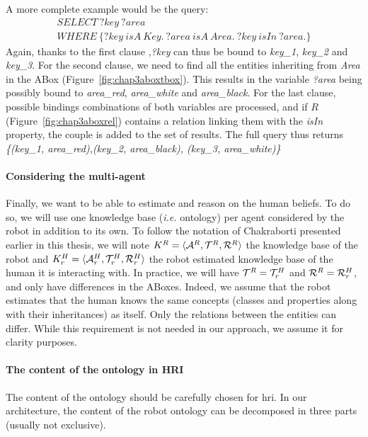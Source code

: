 \documentclass[a4paper,11pt,twoside]{StyleThese}
\begin{document}
A more complete example would be the query:
\begin{multline*}
SELECT \ ?key \ ?area\\
WHERE \ \{?key \ isA \ Key. \ ?area \ isA \ Area. \ ?key\ isIn \ ?area.\}
\end{multline*}
Again, thanks to the first clause ,\textit{?key} can thus be bound to \textit{key\_1}, \textit{key\_2} and \textit{key\_3}. For the second clause, we need to find all the entities inheriting from \textit{Area} in the ABox (Figure~\ref{fig:chap3aboxtbox}). This results in the variable \textit{?area} being possibly bound to \textit{area\_red}, \textit{area\_white} and \textit{area\_black}. For the last clause, possible bindings combinations of both variables are processed, and if $R$ (Figure~\ref{fig:chap3aboxrel}) contains a relation linking them with the \textit{isIn} property, the couple is added to the set of results. The full query thus returns \textit{\{(key\_1, area\_red),(key\_2, area\_black), (key\_3, area\_white)\}}


\paragraph{Considering the multi-agent}
Finally, we want to be able to estimate and reason on the human beliefs. To do so, we will use one knowledge base (\textit{i.e.} ontology) per agent considered by the robot in addition to its own. To follow the notation of Chakraborti \cite{chakraborti2018human} presented earlier in this thesis, we will note $K^R = \langle \mathcal{A}^R, \mathcal{T}^R, \mathcal{R}^R \rangle$ the knowledge base of the robot and $K^H_r = \langle \mathcal{A}^H_r, \mathcal{T}^H_r, \mathcal{R}^H_r \rangle$ the robot estimated knowledge base of the human it is interacting with. In practice, we will have $\mathcal{T}^R = \mathcal{T}^H_r$ and $\mathcal{R}^R = \mathcal{R}^H_r$, and only have differences in the ABoxes. Indeed, we assume that the robot estimates that the human knows the same concepts (classes and properties along with their inheritances) as itself. Only the relations between the entities can differ. While this requirement is not needed in our approach, we assume it for clarity purposes.

\paragraph{The content of the ontology in HRI}
The content of the ontology should be carefully chosen for \acrshort{hri}. In our architecture, the content of the robot ontology can be decomposed in three parts (usually not exclusive). 
\end{document}
